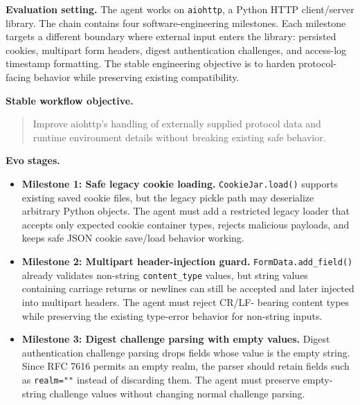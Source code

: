 \documentclass{article}
\begin{document}
  \begin{tcolorbox}[
      colback=gray!4,
      colframe=black!75,
      title={Example: SWE-Chain-Evo aiohttp protocol-boundary hardening chain},
      fonttitle=\bfseries,
      breakable,
      enhanced,
      before skip=4pt,
      after skip=4pt,
      enlargepage flexible,
      pad at break*=1mm
  ]
  \small

  \textbf{Evaluation setting.}
  The agent works on \texttt{aiohttp}, a Python HTTP client/server library. The chain contains four software-engineering
milestones. Each milestone targets a different boundary where external input enters the library: persisted cookies, multipart
form headers, digest authentication challenges, and access-log timestamp formatting. The stable engineering objective is to
harden protocol-facing behavior while preserving existing compatibility.

  \vspace{0.5em}
  \textbf{Stable workflow objective.}
  \begin{quote}
  Improve aiohttp's handling of externally supplied protocol data and runtime environment details without breaking existing safe
behavior.
  \end{quote}

  \vspace{0.5em}
  \textbf{Evo stages.}

  \begin{itemize}[leftmargin=1.5em]
      \item \textbf{Milestone 1: Safe legacy cookie loading.}
      \texttt{CookieJar.load()} supports existing saved cookie files, but the legacy pickle path may deserialize arbitrary
Python objects. The agent must add a restricted legacy loader that accepts only expected cookie container types, rejects
malicious payloads, and keeps safe JSON cookie save/load behavior working.

      \item \textbf{Milestone 2: Multipart header-injection guard.}
      \texttt{FormData.add\_field()} already validates non-string \texttt{content\_type} values, but string values containing
carriage returns or newlines can still be accepted and later injected into multipart headers. The agent must reject CR/LF-
bearing content types while preserving the existing type-error behavior for non-string inputs.

      \item \textbf{Milestone 3: Digest challenge parsing with empty values.}
      Digest authentication challenge parsing drops fields whose value is the empty string. Since RFC 7616 permits an empty
realm, the parser should retain fields such as \texttt{realm=""} instead of discarding them. The agent must preserve empty-
string challenge values without changing normal challenge parsing.


\end{itemize}
\end{tcolorbox}
\end{document}
